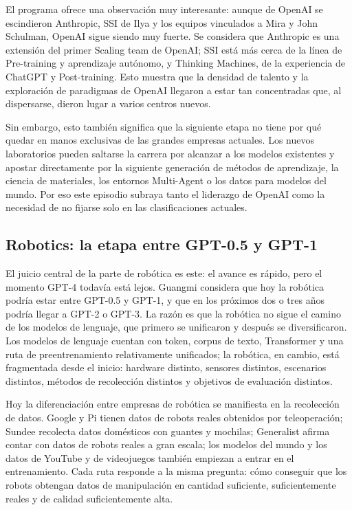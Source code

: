 El programa ofrece una observación muy interesante: aunque de OpenAI se escindieron Anthropic, SSI de Ilya y los equipos vinculados a Mira y John Schulman, OpenAI sigue siendo muy fuerte. Se considera que Anthropic es una extensión del primer Scaling team de OpenAI; SSI está más cerca de la línea de Pre-training y aprendizaje autónomo, y Thinking Machines, de la experiencia de ChatGPT y Post-training. Esto muestra que la densidad de talento y la exploración de paradigmas de OpenAI llegaron a estar tan concentradas que, al dispersarse, dieron lugar a varios centros nuevos.

Sin embargo, esto también significa que la siguiente etapa no tiene por qué quedar en manos exclusivas de las grandes empresas actuales. Los nuevos laboratorios pueden saltarse la carrera por alcanzar a los modelos existentes y apostar directamente por la siguiente generación de métodos de aprendizaje, la ciencia de materiales, los entornos Multi-Agent o los datos para modelos del mundo. Por eso este episodio subraya tanto el liderazgo de OpenAI como la necesidad de no fijarse solo en las clasificaciones actuales.

\subsection{Robotics: la etapa entre GPT-0.5 y GPT-1}

El juicio central de la parte de robótica es este: el avance es rápido, pero el momento GPT-4 todavía está lejos. Guangmi considera que hoy la robótica podría estar entre GPT-0.5 y GPT-1, y que en los próximos dos o tres años podría llegar a GPT-2 o GPT-3. La razón es que la robótica no sigue el camino de los modelos de lenguaje, que primero se unificaron y después se diversificaron. Los modelos de lenguaje cuentan con token, corpus de texto, Transformer y una ruta de preentrenamiento relativamente unificados; la robótica, en cambio, está fragmentada desde el inicio: hardware distinto, sensores distintos, escenarios distintos, métodos de recolección distintos y objetivos de evaluación distintos.

Hoy la diferenciación entre empresas de robótica se manifiesta en la recolección de datos. Google y Pi tienen datos de robots reales obtenidos por teleoperación; Sundee recolecta datos domésticos con guantes y mochilas; Generalist afirma contar con datos de robots reales a gran escala; los modelos del mundo y los datos de YouTube y de videojuegos también empiezan a entrar en el entrenamiento. Cada ruta responde a la misma pregunta: cómo conseguir que los robots obtengan datos de manipulación en cantidad suficiente, suficientemente reales y de calidad suficientemente alta.


